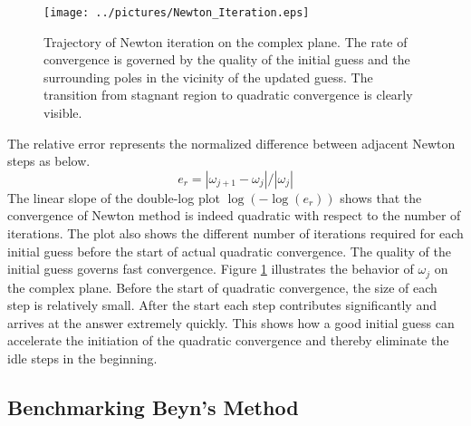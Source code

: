 \documentclass[11pt,letterpaper]{article}
\begin{document}
\begin{figure}\label{fig:NewtonIterate}
\begin{center}
\texttt{[image: ../pictures/Newton\_Iteration.eps]}
\end{center}
\caption{Trajectory of Newton iteration on the complex plane. \textnormal{The rate of convergence is governed by the quality of the initial guess and the surrounding poles in the vicinity of the updated guess. The transition from stagnant region to quadratic convergence is clearly visible.}} 
\end{figure}
The relative error represents the normalized difference between adjacent Newton steps as below.
\begin{equation}\label{eq:er}
e_r=|\omega_{j+1} - \omega_j|/|\omega_j|
\end{equation}
The linear slope of the double-log plot $\log(-\log(e_r))$ shows that the convergence of Newton method is indeed quadratic with respect to the number of iterations. The plot also shows the different number of iterations required for each initial guess before the start of actual quadratic convergence. The quality of the initial guess governs fast convergence. Figure \ref{fig:NewtonIterate} illustrates the behavior of $\omega_j$ on the complex plane. Before the start of quadratic convergence, the size of each step is relatively small. After the start each step contributes significantly and arrives at the answer extremely quickly. This shows how a good initial guess can accelerate the initiation of the quadratic convergence and thereby eliminate the idle steps in the beginning. 
\subsection{Benchmarking Beyn's Method}
\end{document}
